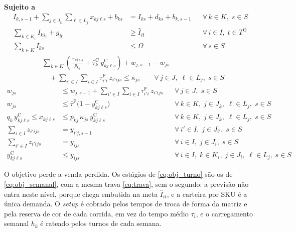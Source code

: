 \documentclass[
    12pt,
    openright,
    oneside,
    a4paper,
    fleqn,
    chapter=TITLE,
    section=TITLE,
    english,
    brazil
]{abntex2}
\begin{document}
\noindent\textbf{Sujeito a}
\begin{align}
I_{k,s-1} + \sum_{j \in J_k}\sum_{\ell \in L_j} x_{kj\ell s} + b_{ks}
    &= I_{ks} + d_{ks} + b_{k,s-1}
    && \forall\, k \in K,\; s \in S \label{eq:balanco_turno} \\
\sum_{k \in K_i} I_{k\bar{s}_t} + g_{it} &\ge \hat{I}_{it}
    && \forall\, i \in I,\; t \in T^{\mathrm{O}} \label{eq:meta_semana} \\
\sum_{k \in K} I_{ks} &\le \Omega
    && \forall\, s \in S \label{eq:capacidade_armazem_turno}
\end{align}
\begin{equation}
\begin{split}
    &\sum_{k \in K} \left( \frac{x_{kj\ell s}}{p_{kj}} + \bar{\tau}^{\mathrm{C}}_{k}\, y^{\mathrm{C}}_{kj\ell s} \right) + w_{j,s-1} - w_{js} \\
    &\quad + \sum_{i' \in I}\sum_{i \in I} \tau^{\mathrm{F}}_{i'i}\, z_{i'ijs} \le \kappa_{js}
    \qquad \forall\, j \in J,\; \ell \in L_j,\; s \in S
\end{split}
\label{eq:capacidade_turno}
\end{equation}
\begin{align}
w_{js} &\le w_{j,s-1} + \sum_{i' \in I}\sum_{i \in I} \tau^{\mathrm{F}}_{i'i}\, z_{i'ijs}
    && \forall\, j \in J,\; s \in S \label{eq:troca_pendente} \\
w_{js} &\le \bar{\tau}^{\mathrm{F}} \bigl( 1 - y^{\mathrm{C}}_{kj\ell s} \bigr)
    && \forall\, k \in K,\; j \in J_k,\; \ell \in L_j,\; s \in S \label{eq:troca_concluida} \\
q_{k}\, y^{\mathrm{C}}_{kj\ell s} \le x_{kj\ell s} &\le p_{kj}\, \kappa_{js}\, y^{\mathrm{C}}_{kj\ell s}
    && \forall\, k \in K,\; j \in J_k,\; \ell \in L_j,\; s \in S \label{eq:lote_minimo_turno} \\
\sum_{i \in I} z_{i'ijs} &= y_{i'j,s-1}
    && \forall\, i' \in I,\; j \in J_{i'},\; s \in S \label{eq:forma_saida} \\
\sum_{i' \in I} z_{i'ijs} &= y_{ijs}
    && \forall\, i \in I,\; j \in J_i,\; s \in S \label{eq:forma_entrada} \\
y^{\mathrm{C}}_{kj\ell s} &\le y_{ijs}
    && \forall\, i \in I,\; k \in K_i,\; j \in J_i,\; \ell \in L_j,\; s \in S \label{eq:cor_da_forma}
\end{align}

O objetivo perde a venda perdida. Os estágios de \eqref{eq:obj_turno} são os de \eqref{eq:obj_semanal}, com a mesma trava \eqref{eq:trava}, sem o segundo: a previsão não entra neste nível, porque chega embutida na meta $\hat{I}_{it}$, e a carteira por SKU é a única demanda. O \textit{setup} é cobrado pelos tempos de troca de forma da matriz e pela reserva de cor de cada corrida, em vez do tempo médio $\tau_i$, e o carregamento semanal $h_k$ é rateado pelos turnos de cada semana.
\end{document}
